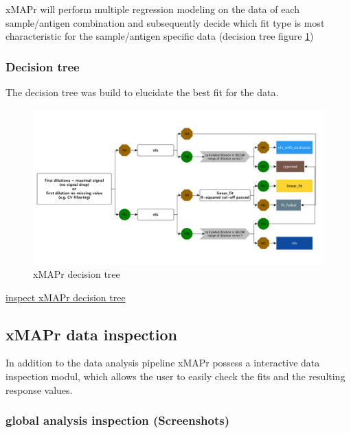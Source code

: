 \documentclass[]{book}
\theoremstyle{definition}
\theoremstyle{definition}
\theoremstyle{definition}
\theoremstyle{remark}
\begin{document}
xMAPr will perform multiple regression modeling on the data of each
sample/antigen combination and subsequently decide which fit type is
most characteristic for the sample/antigen specific data (decision tree
figure \ref{fig:xMAPrDecTree})

\subsubsection{Decision tree}\label{decision-tree}

The decision tree was build to elucidate the best fit for the data.

\begin{figure}
\includegraphics[width=33.58in]{figures/fit_decision_tree_small} \caption{xMAPr decision tree}\label{fig:xMAPrDecTree}
\end{figure}

\href{figures/fit_decision_tree_small.png}{inspect xMAPr decision tree}

\subsection{xMAPr data inspection}\label{xmapr-data-inspection}

In addition to the data analysis pipeline xMAPr possess a interactive
data inspection modul, which allows the user to easily check the fits
and the resulting response values.

\subsubsection{global analysis inspection
(Screenshots)}\label{global-analysis-inspection-screenshots}
\end{document}
